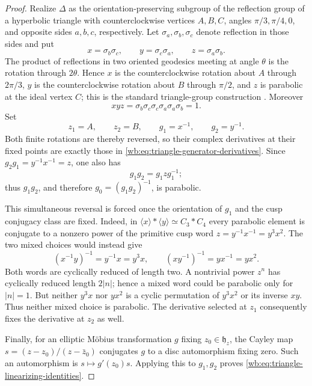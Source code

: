 \begin{proof}
Realize \(\Delta\) as the orientation-preserving subgroup of the reflection
group of a hyperbolic triangle with counterclockwise vertices \(A,B,C\),
angles \(\pi/3,\pi/4,0\), and opposite sides \(a,b,c\), respectively.  Let
\(\sigma_a,\sigma_b,\sigma_c\) denote reflection in those sides and put
\[
 x=\sigma_b\sigma_c,\qquad
 y=\sigma_c\sigma_a,\qquad
 z=\sigma_a\sigma_b.
\]
The product of reflections in two oriented geodesics meeting at angle
\(\theta\) is the rotation through \(2\theta\).  Hence \(x\) is the
counterclockwise rotation about \(A\) through \(2\pi/3\), \(y\) is the
counterclockwise rotation about \(B\) through \(\pi/2\), and \(z\) is
parabolic at the ideal vertex \(C\); this is the standard triangle-group
construction \cite[Chapters~7 and~10]{Beardon1983}.  Moreover
\[
 xyz=\sigma_b\sigma_c\sigma_c\sigma_a\sigma_a\sigma_b=1.
\]
Set
\[
 z_1=A,\qquad z_2=B,\qquad g_1=x^{-1},\qquad g_2=y^{-1}.
\]
Both finite rotations are thereby reversed, so their complex derivatives at
their fixed points are exactly those in
\cref{wb:eq:triangle-generator-derivatives}.  Since
\(g_2g_1=y^{-1}x^{-1}=z\), one also has
\[
 g_1g_2=g_1zg_1^{-1};
\]
thus \(g_1g_2\), and therefore \(g_0=(g_1g_2)^{-1}\), is parabolic.

This simultaneous reversal is forced once the orientation of \(g_1\) and
the cusp conjugacy class are fixed.  Indeed, in
\(\langle x\rangle*\langle y\rangle\simeq C_3*C_4\) every parabolic element
is conjugate to a nonzero power of the primitive cusp word
\(z=y^{-1}x^{-1}=y^3x^2\).  The two mixed choices would instead give
\[
 (x^{-1}y)^{-1}=y^{-1}x=y^3x,
 \qquad
 (xy^{-1})^{-1}=yx^{-1}=yx^2.
\]
Both words are cyclically reduced of length two.  A nontrivial power
\(z^n\) has cyclically reduced length \(2|n|\); hence a mixed word could be
parabolic only for \(|n|=1\).  But neither \(y^3x\) nor \(yx^2\) is a cyclic
permutation of \(y^3x^2\) or its inverse \(xy\).  Thus neither mixed choice
is parabolic.  The derivative selected at \(z_1\) consequently fixes the
derivative at \(z_2\) as well.

Finally, for an elliptic M\"obius transformation \(g\) fixing
\(z_0\in\mathfrak h_z\), the Cayley map
\(s=(z-z_0)/(z-\bar z_0)\) conjugates \(g\) to a disc automorphism fixing
zero.  Such an automorphism is \(s\mapsto g'(z_0)s\).  Applying this to
\(g_1,g_2\) proves \cref{wb:eq:triangle-linearizing-identities}.
\end{proof}

